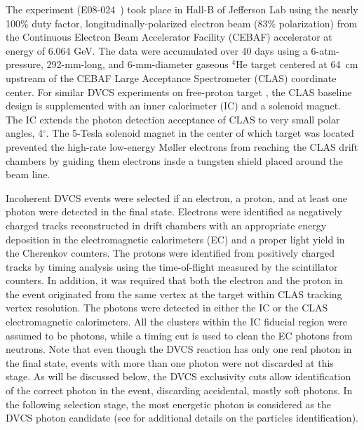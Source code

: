 \documentclass[twocolumn,nofootinbib,showpacs,prl,superscriptaddress,secnumarabic,amssymb,nobibnotes,aps,floatfix]{revtex4}
\begin{document}
The experiment (E08-024~\cite{Hafidi:2008pr}) took place in Hall-B of Jefferson 
Lab using the nearly 100\% duty factor, longitudinally-polarized electron beam 
(83$\%$ polarization) from the Continuous Electron Beam Accelerator Facility 
(CEBAF) accelerator at energy of 6.064 GeV. The data were accumulated 
over 40 days using a 6-atm-pressure, 292-mm-long, and 6-mm-diameter gaseous 
$^4$He target centered at 64~cm upstream of the CEBAF Large Acceptance 
Spectrometer (CLAS) coordinate center. For similar DVCS experiments on free-proton target
\cite{Girod:2007aa,Jo:2015ema}, the CLAS baseline design \cite{Mecking:2003zu} 
is supplemented with an inner calorimeter (IC) and a solenoid magnet. The IC extends 
the photon detection acceptance of CLAS to very small polar angles, 4$^{\circ}$. 
The 5-Tesla solenoid magnet in the center of which target was located 
prevented the high-rate low-energy M{\o}ller electrons from reaching the CLAS drift chambers by guiding them electrons insde a tungsten shield placed around the beam line. 


Incoherent DVCS events were selected if an electron, a proton, and at least one 
photon were detected in the final state. Electrons were identified as negatively charged tracks reconstructed in drift chambers with an appropriate energy deposition in the electromagnetic calorimeters (EC) and a proper 
light yield in the Cherenkov counters. The protons were identified from positively charged tracks by 
timing analysis using the time-of-flight measured by the scintillator counters. 
In addition, it was required that both the electron and the proton in the event originated from the same vertex at the target within CLAS tracking vertex resolution. The photons were detected in either the IC or 
the CLAS electromagnetic calorimeters. All the clusters within the IC fiducial region 
were assumed to be photons, while a timing cut is used to clean the EC photons 
from neutrons. Note that even though the DVCS reaction has only one real photon 
in the final state, events with more than one photon were not discarded at 
this stage. As will be discussed below, the DVCS exclusivity cuts allow identification of the correct photon in the event, discarding accidental, mostly soft photons. In the following selection stage, the most energetic photon is considered as the DVCS 
photon candidate (see \cite{Hattawy:thesis} for additional details on the particles identification).  
\end{document}
